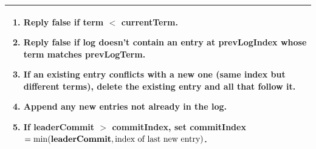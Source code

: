 {\begin{tabular}{|l|p{9cm}|}
        \hline
        \multicolumn{2}{|p{10cm}|}{%
            \parbox{11cm}{%
                \begin{enumerate}
                    \item Reply \textbf{false} if \textbf{term} $<$ \textbf{currentTerm}.
                    \item Reply \textbf{false} if log doesn't contain an entry at \textbf{prevLogIndex} whose term matches \textbf{prevLogTerm}.
                    \item If an existing entry conflicts with a new one (same index but different terms), delete the existing entry and all that follow it.
                    \item Append any new entries not already in the log.
                    \item If \textbf{leaderCommit} $>$ \textbf{commitIndex}, set \textbf{commitIndex} $=\min(\text{\textbf{leaderCommit}}, \text{index of last new entry})$.
                \end{enumerate}
            }
        } \\
        \hline
    \end{tabular}
}

